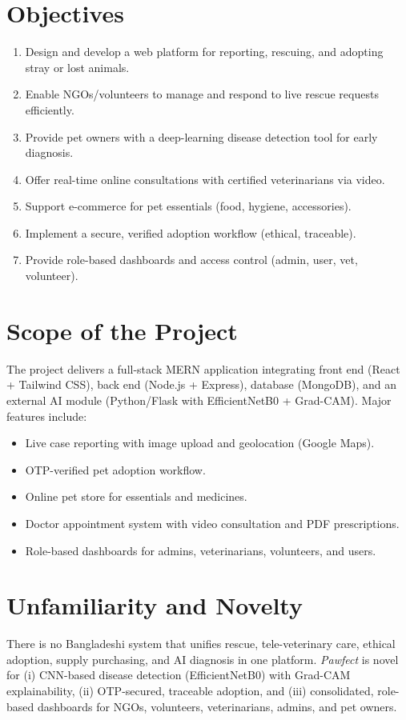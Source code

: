 \documentclass[12pt,a4paper]{report}
\numberwithin{figure}{chapter}
\numberwithin{table}{chapter}
\begin{document}
\section{Objectives}
\begin{enumerate}
  \item Design and develop a web platform for reporting, rescuing, and adopting stray or lost animals.
  \item Enable NGOs/volunteers to manage and respond to live rescue requests efficiently.
  \item Provide pet owners with a deep-learning disease detection tool for early diagnosis.
  \item Offer real-time online consultations with certified veterinarians via video.
  \item Support e-commerce for pet essentials (food, hygiene, accessories).
  \item Implement a secure, verified adoption workflow (ethical, traceable).
  \item Provide role-based dashboards and access control (admin, user, vet, volunteer).
\end{enumerate}

\section{Scope of the Project}
The project delivers a full-stack MERN application integrating front end (React + Tailwind CSS), back end (Node.js + Express), database (MongoDB), and an external AI module (Python/Flask with EfficientNetB0 + Grad-CAM). Major features include:
\begin{itemize}
  \item Live case reporting with image upload and geolocation (Google Maps).
  \item OTP-verified pet adoption workflow.
  \item Online pet store for essentials and medicines.
  \item Doctor appointment system with video consultation and PDF prescriptions.
  \item Role-based dashboards for admins, veterinarians, volunteers, and users.
\end{itemize}

\section{Unfamiliarity and Novelty}
There is no Bangladeshi system that unifies rescue, tele-veterinary care, ethical adoption, supply purchasing, and AI diagnosis in one platform. \textit{Pawfect} is novel for (i) CNN-based disease detection (EfficientNetB0) with Grad-CAM explainability, (ii) OTP-secured, traceable adoption, and (iii) consolidated, role-based dashboards for NGOs, volunteers, veterinarians, admins, and pet owners.
\end{document}
